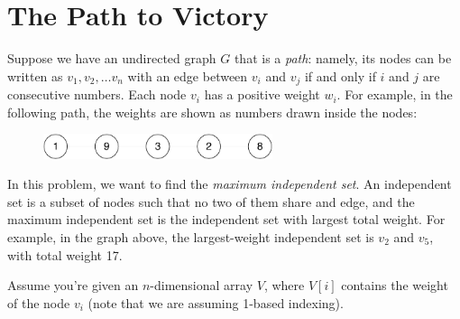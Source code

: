 \section{The Path to Victory}

Suppose we have an undirected graph $G$ that is a \textit{path}: namely, its nodes can be written as $v_1, v_2, \ldots v_n$ with an edge between $v_i$ and $v_j$ if and only if $i$ and $j$ are consecutive numbers. Each node $v_i$ has a positive weight $w_i$. For example, in the following path, the weights are shown as numbers drawn inside the nodes:

\begin{figure}[tbh!]
	\centering
	\includegraphics[width=0.6\textwidth]{path.pdf}
\end{figure}

In this problem, we want to find the \textit{maximum independent set}. An independent set is a subset of nodes such that no two of them share and edge, and the maximum independent set is the independent set with largest total weight. For example, in the graph above, the largest-weight independent set is $v_2$ and $v_5$, with total weight 17.

Assume you're given an $n$-dimensional array $V$, where $V[i]$ contains the weight of the node $v_i$ (note that we are assuming 1-based indexing).

